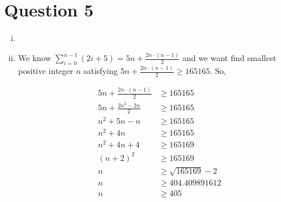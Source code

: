 \documentclass[12pt]{article}
\begin{document}
\section*{Question 5}
    \begin{enumerate}[i)]
        \item

        \item

        We know $\sum\limits_{i=0}^{n-1} (2i + 5) = 5n + \frac{2n \cdot (n - 1)}{2}$ and
        we want find smallest positive integer $n$ satisfying
        $5n + \frac{2n \cdot (n - 1)}{2} \geq 165165$. So,

        \begin{align*}
            5n + \frac{2n \cdot (n - 1)}{2} &\geq 165165 \\
            5n + \frac{2n^2 - 2n}{2} &\geq 165165 \\
            n^2 + 5n - n &\geq 165165 \\
            n^2 + 4n &\geq 165165 \\
            n^2 + 4n + 4 &\geq 165169 \\
            (n + 2)^2 &\geq 165169 \\
            n &\geq \sqrt{165169} - 2 \\
            n &\geq 404.409891612 \\
            n &\geq 405
        \end{align*}
    \end{enumerate}
\end{document}
